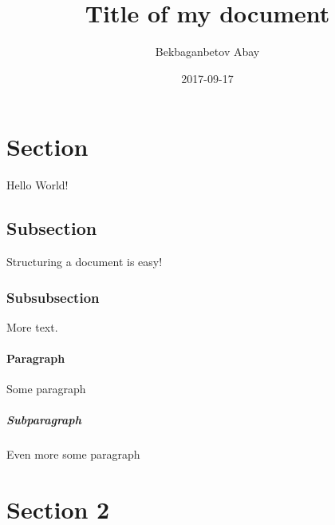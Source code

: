 \documentclass{article}
\title{Title of my document}
\date{2017-09-17}
\author{Bekbaganbetov Abay}
\begin{document}
\maketitle
{}
\newpage
{}

\section{Section}
Hello World!

\subsection{Subsection}
Structuring a document is easy!

\subsubsection{Subsubsection}
More text.

\paragraph{Paragraph}
Some paragraph

\subparagraph{Subparagraph}
Even more some paragraph

\section{Section 2}
\end{document}
